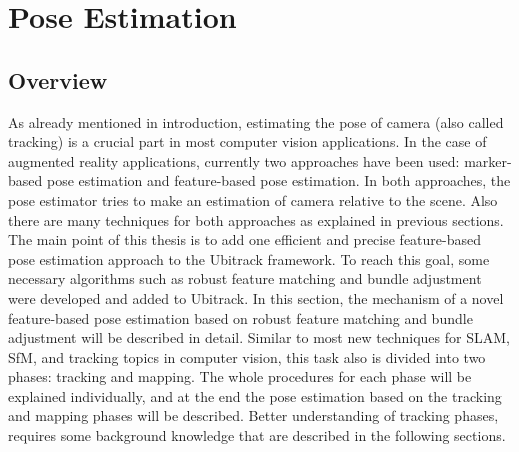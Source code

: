 \chapter{Pose Estimation}\label{chapter:pose_estimation}
\section{Overview}\label{sec:pose_estimation_overview}
As already mentioned in introduction, estimating the pose of camera (also called tracking) is a crucial part in most computer vision applications. In the case of augmented reality applications, currently two approaches have been used: marker-based pose estimation and feature-based pose estimation. In both approaches, the pose estimator tries to make an estimation of camera relative to the scene. Also there are many techniques for both approaches as explained in previous sections. \\
The main point of this thesis is to add one efficient and precise feature-based pose estimation approach to the Ubitrack framework. To reach this goal, some necessary algorithms such as robust feature matching and bundle adjustment were developed and added to Ubitrack. In this section, the mechanism of a novel feature-based pose estimation based on robust feature matching and bundle adjustment will be described in detail. Similar to most new techniques for SLAM, SfM, and tracking topics in computer vision, this task also is divided into two phases: tracking and mapping. The whole procedures for each phase will be explained individually, and at the end the pose estimation based on the tracking and mapping phases will be described. Better understanding of tracking phases, requires some background knowledge that are described in the following sections.

